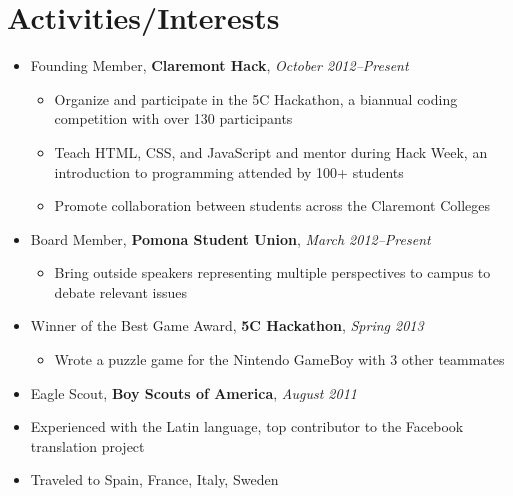 \documentclass[11pt]{article}
\newcommand\activity[3]{{#1, \textbf{#3}, \textit{#2}}}
\begin{document}
\section*{Activities/Interests}
\begin{itemize}
    \item \activity{Founding Member}{October 2012--Present}{Claremont Hack}
        \begin{itemize}
            \item Organize and participate in the 5C Hackathon, a biannual
                coding competition with over 130 participants
            \item Teach HTML, CSS, and JavaScript and mentor during Hack Week, an
                introduction to programming attended by 100+ students
            \item Promote collaboration between students across the Claremont
                Colleges
        \end{itemize}
    \item \activity{Board Member}{March 2012--Present}{Pomona Student Union}
        \begin{itemize}
            \item Bring outside speakers representing multiple perspectives to
                campus to debate relevant issues
        \end{itemize}
    \item \activity{Winner of the Best Game Award}{Spring 2013}{5C Hackathon}
        \begin{itemize}
            \item Wrote a puzzle game for the Nintendo GameBoy with 3 other
                teammates
        \end{itemize}
    \item \activity{Eagle Scout}{August 2011}{Boy Scouts of America}
    \item Experienced with the Latin language, top contributor to the Facebook
        translation project
    \item Traveled to Spain, France, Italy, Sweden
\end{itemize}
\end{document}
